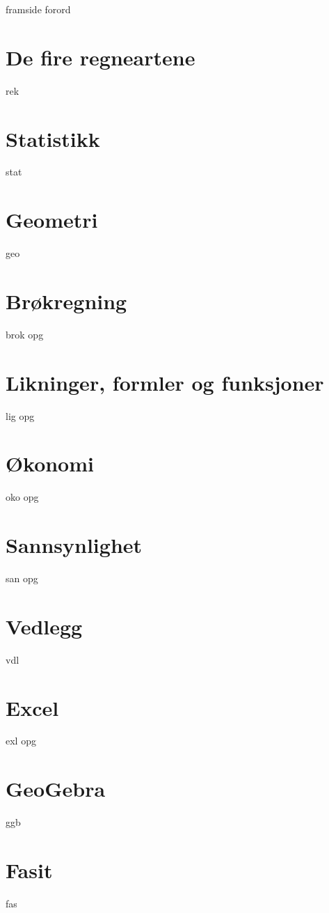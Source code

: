 




{framside}
{forord}

\tableofcontents
\chapter{De fire regneartene}
\newpage
{rek}

\chapter{Statistikk}
\newpage
{stat}

\chapter{Geometri}
{geo}

\chapter{Brøkregning \label{Br}}
\newpage
{brok}
\newpage
{opg}

\chapter{Likninger, formler og funksjoner \label{Lig}}
{lig}
{opg}


\chapter{Økonomi \label{Oko}}
{oko}
{opg}

\chapter{Sannsynlighet \label{San}} 
{san}
{opg}
\newpage


\chapter*{Vedlegg} 
{vdl}

\chapter*{Excel} 
{exl}	
\newpage
{opg}	


\chapter*{GeoGebra} 
{ggb}	

\chapter*{Fasit}
{fas}







